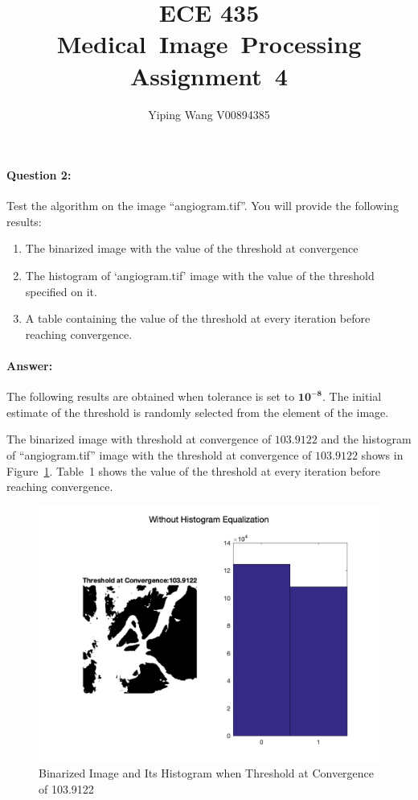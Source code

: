 \documentclass[12pt, letter]{article}
\newcommand{\courseName}{ECE 435 Medical~Image~Processing}
\newcommand{\assignName}{Assignment~4}
\begin{document}
\pagestyle{titlesec_assignment}

\title{\courseName\\\assignName}
\author{Yiping Wang V00894385}
\maketitle

\paragraph{Question 2:} Test the algorithm on the image ``angiogram.tif''. You will provide the following results:
\begin{enumerate}
    \item The binarized image with the value of the threshold at convergence
    \item The histogram of ‘angiogram.tif’ image with the value of the threshold specified on it.
    \item A table containing the value of the threshold at every iteration before reaching convergence.
\end{enumerate}

\paragraph{Answer:}
The following results are obtained when tolerance is set to $\mathbf{10^{-8}}$. The initial estimate of the threshold is randomly selected from the element of the image.  

The binarized image with threshold at convergence of $\mathbf{103.9122}$ and the histogram of ``angiogram.tif'' image with the threshold at convergence of $\mathbf{103.9122}$ shows in Figure~\ref{fig:q2-1}. Table~1 shows the value of the threshold at every iteration before reaching convergence.

\begin{figure}
    \centering
    \includegraphics[width=14cm]{q2-1.png}
    \caption{Binarized Image and Its Histogram when Threshold at Convergence of 103.9122}
    \label{fig:q2-1}
\end{figure}
\end{document}
